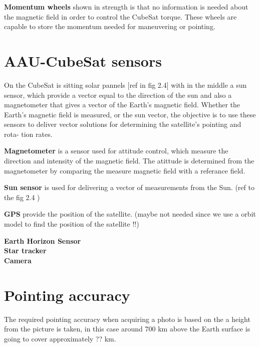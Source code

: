 %
\textbf{Momentum wheels} shown in  strength is that no information is needed about the magnetic field in order to control the CubeSat torque. These wheels are capable to store the momentum needed for maneuvering or pointing.
%
\section{AAU-CubeSat sensors}
On the CubeSat is sitting solar pannels [ref in fig 2.4] with in the middle a sun sensor, which provide a vector equal to the direction of the sun and also a magnetometer that gives a vector of the Earth's magnetic field. Whether the Earth’s magnetic field is measured, or the sun vector, the objective is to use these sensors to deliver vector solutions for determining the satellite’s pointing and rota- tion rates.

\textbf{Magnetometer} is a sensor used for attitude control, which measure the direction and intensity of the magnetic field. The atittude is determined from the magnetometer by comparing the measure magnetic field with a referance field.

\textbf{Sun sensor} is used for delivering a vector of measurements from the Sun. (ref to the fig 2.4 )

\textbf{GPS} provide the position of the satellite. (maybe not needed since we use a orbit model to find the position of the satellite !!)

\textbf{Earth Horizon Sensor } \\
\textbf{Star tracker}\\
\textbf{Camera}
%
\section{Pointing accuracy}
The required pointing accuracy when acquiring a photo is based on the a height from the picture is taken, in this case around 700 km above the Earth surface is going to cover approximately ?? km. 



